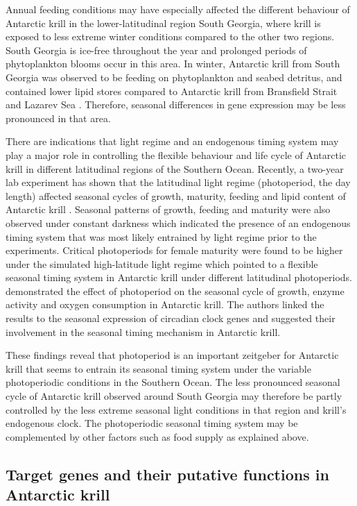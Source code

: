 Annual feeding conditions may have especially affected the different behaviour
of Antarctic krill in the lower-latitudinal region South Georgia, where krill
is exposed to less extreme winter conditions compared to the other two regions.
South Georgia is ice-free throughout the year and prolonged periods of
phytoplankton blooms occur in this area. In winter, Antarctic krill from South
Georgia was observed to be feeding on phytoplankton and seabed detritus, and
contained lower lipid stores compared to Antarctic krill from Bransfield Strait
and Lazarev Sea \citep{schmidt_feeding_2014}. Therefore, seasonal differences
in gene expression may be less pronounced in that area.

There are indications that light regime and an endogenous timing system may
play a major role in controlling the flexible behaviour and life cycle of
Antarctic krill in different latitudinal regions of the Southern Ocean.
Recently, a two-year lab experiment has shown that the latitudinal light regime
(photoperiod, the day length) affected seasonal cycles of growth, maturity,
feeding and lipid content of Antarctic krill \citep{horing_light_2018}.
Seasonal patterns of growth, feeding and maturity were also observed under
constant darkness which indicated the presence of an endogenous timing system
that was most likely entrained by light regime prior to the experiments.
Critical photoperiods for female maturity were found to be higher under the
simulated high-latitude light regime which pointed to a flexible seasonal
timing system in Antarctic krill under different latitudinal photoperiods.
\citet{piccolin_seasonal_2018} demonstrated the effect of photoperiod on the
seasonal cycle of growth, enzyme activity and oxygen consumption in Antarctic
krill. The authors linked the results to the seasonal expression of circadian
clock genes and suggested their involvement in the seasonal timing mechanism in
Antarctic krill.

These findings reveal that photoperiod is an important zeitgeber for Antarctic
krill that seems to entrain its seasonal timing system under the variable
photoperiodic conditions in the Southern Ocean. The less pronounced seasonal
cycle of Antarctic krill observed around South Georgia may therefore be partly
controlled by the less extreme seasonal light conditions in that region and
krill's endogenous clock. The photoperiodic seasonal timing system may be
complemented by other factors such as food supply as explained above.

\subsection{Target genes and their putative functions in Antarctic krill}


